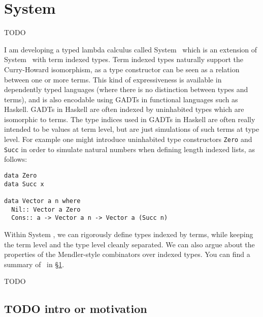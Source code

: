 \chapter{System \Fi}\label{ch:fi} TODO

\newcommand{\newFi}[1]{\colorbox{grey}{\ensuremath{#1}}}

I am developing a typed lambda calculus called System \Fi\, which is an
extension of System \Fw\ with term indexed types. Term indexed types
naturally support the Curry-Howard isomorphism, as a type constructor can be
seen as a relation between one or more terms.  This kind of expressiveness is
available in dependently typed languages (where there is no distinction between
types and terms), and is also encodable using GADTs in functional languages
such as Haskell.  GADTs in Haskell are often indexed by uninhabited types
which are isomorphic to terms. The type indices used in GADTs in Haskell are
often really intended to be values at term level, but are just simulations of
such terms at type level.  For example one might introduce uninhabited type
constructors \verb+Zero+ and \verb+Succ+ in order to simulate natural numbers
when defining length indexed lists, as follows:
\begin{verbatim}
data Zero
data Succ x

data Vector a n where
  Nil:: Vector a Zero
  Cons:: a -> Vector a n -> Vector a (Succ n)
\end{verbatim}  

Within System \Fi, we can rigorously define types indexed by terms,
while keeping the term level and the type level cleanly separated.
We can also argue about the properties of the Mendler-style combinators
over indexed types.  You can find a summary of \Fi\ in \S\ref{ch:fi}.

TODO
\section{TODO intro or motivation}







